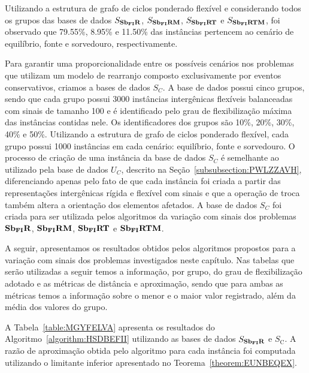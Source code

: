 Utilizando a estrutura de grafo de ciclos ponderado flexível e considerando todos os grupos das bases de dados $S_{\textbf{Sb\textsubscript{FI}R}}{}$, $S_{\textbf{Sb\textsubscript{FI}RM}}{}$, $S_{\textbf{Sb\textsubscript{FI}RT}}{}$ e $S_{\textbf{Sb\textsubscript{FI}RTM}}{}$, foi observado que 79.55\%,  8.95\% e 11.50\% das instâncias pertencem ao cenário de equilíbrio, fonte e sorvedouro, respectivamente. 

Para garantir uma proporcionalidade entre os possíveis cenários nos problemas que utilizam um modelo de rearranjo composto exclusivamente por eventos conservativos, criamos a bases de dados $S_{C}$. A base de dados possui cinco grupos, sendo que cada grupo possui 3000 instâncias intergênicas flexíveis balanceadas com sinais de tamanho 100 e é identificado pelo grau de flexibilização máxima das instâncias contidas nele. Os identificadores dos grupos são 10\%, 20\%, 30\%, 40\% e 50\%. Utilizando a estrutura de grafo de ciclos ponderado flexível, cada grupo possui 1000 instâncias em cada cenário: equilíbrio, fonte e sorvedouro. O processo de criação de uma instância da base de dados $S_{C}$ é semelhante ao utilizado pela base de dados $U_{C}$, descrito na Seção~\ref{subsubsection:PWLZZAVH}, diferenciando apenas pelo fato de que cada instância foi criada a partir das representações intergênicas rígida e flexível com sinais e que a operação de troca também altera a orientação dos elementos afetados. A base de dados $S_{C}$ foi criada para ser utilizada pelos algoritmos da variação com sinais dos problemas $\textbf{Sb\textsubscript{FI}R}{}$, $\textbf{Sb\textsubscript{FI}RM}{}$, $\textbf{Sb\textsubscript{FI}RT}{}$ e $\textbf{Sb\textsubscript{FI}RTM}{}$.

A seguir, apresentamos os resultados obtidos pelos algoritmos propostos para a variação com sinais dos problemas investigados neste capítulo. Nas tabelas que serão utilizadas a seguir temos a informação, por grupo, do grau de flexibilização adotado e as métricas de distância e aproximação, sendo que para ambas as métricas temos a informação sobre o menor e o maior valor registrado, além da média dos valores do grupo.

A Tabela~\ref{table:MGYFELVA} apresenta os resultados do Algoritmo~\ref{algorithm:HSDBEFII} utilizando as bases de dados $S_{\textbf{Sb\textsubscript{FI}R}}{}$ e $S_{\text{C}}$. A razão de aproximação obtida pelo algoritmo para cada instância foi computada utilizando o limitante inferior apresentado no Teorema~\ref{theorem:EUNBEQEX}.



